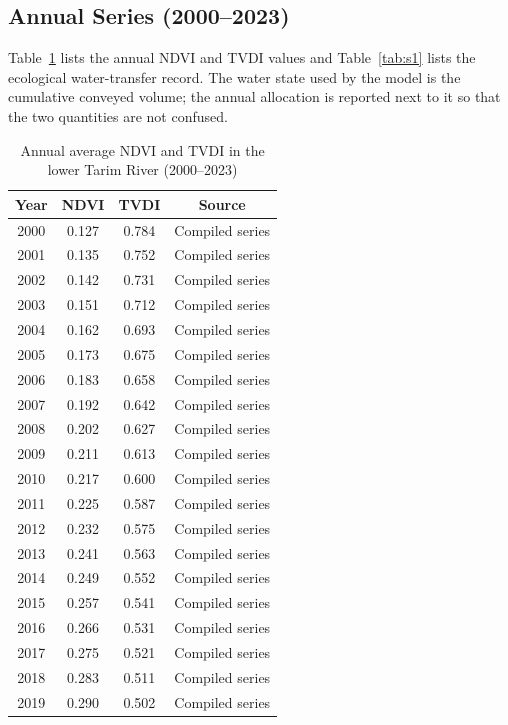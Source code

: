 \documentclass[12pt,a4paper]{article}
\begin{document}
	\subsection{Annual Series (2000--2023)}
\label{sec:s6_tables}

Table~\ref{tab:s2} lists the annual NDVI and TVDI values and Table~\ref{tab:s1} lists the ecological water-transfer record. The water state used by the model is the cumulative conveyed volume; the annual allocation is reported next to it so that the two quantities are not confused.

\begin{table}[H]
	\centering
	\caption{Annual average NDVI and TVDI in the lower Tarim River (2000--2023)}
	\label{tab:s2}
	\begin{tabular}{cccc}
		\toprule
		\textbf{Year} & \textbf{NDVI} & \textbf{TVDI} & \textbf{Source} \\
		\midrule
			2000 & 0.127 & 0.784 & Compiled series \\
			2001 & 0.135 & 0.752 & Compiled series \\
			2002 & 0.142 & 0.731 & Compiled series \\
			2003 & 0.151 & 0.712 & Compiled series \\
			2004 & 0.162 & 0.693 & Compiled series \\
			2005 & 0.173 & 0.675 & Compiled series \\
			2006 & 0.183 & 0.658 & Compiled series \\
			2007 & 0.192 & 0.642 & Compiled series \\
			2008 & 0.202 & 0.627 & Compiled series \\
			2009 & 0.211 & 0.613 & Compiled series \\
			2010 & 0.217 & 0.600 & Compiled series \\
			2011 & 0.225 & 0.587 & Compiled series \\
			2012 & 0.232 & 0.575 & Compiled series \\
			2013 & 0.241 & 0.563 & Compiled series \\
			2014 & 0.249 & 0.552 & Compiled series \\
			2015 & 0.257 & 0.541 & Compiled series \\
			2016 & 0.266 & 0.531 & Compiled series \\
			2017 & 0.275 & 0.521 & Compiled series \\
			2018 & 0.283 & 0.511 & Compiled series \\
			2019 & 0.290 & 0.502 & Compiled series \\

\end{tabular}
\end{table}
\end{document}
